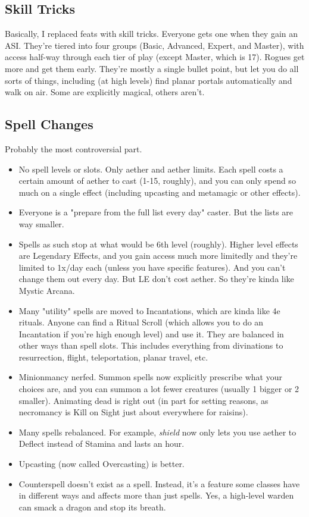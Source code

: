 \subsection*{Skill Tricks}
Basically, I replaced feats with skill tricks. Everyone gets one when they gain an ASI. They're tiered into four groups (Basic, Advanced, Expert, and Master), with access half-way through each tier of play (except Master, which is 17). Rogues get more and get them early. They're mostly a single bullet point, but let you do all sorts of things, including (at high levels) find planar portals automatically and walk on air. Some are explicitly magical, others aren't.
\subsection*{Spell Changes}
Probably the most controversial part.
\begin{itemize}
    \item No spell levels or slots. Only aether and aether limits. Each spell costs a certain amount of aether to cast (1-15, roughly), and you can only spend so much on a single effect (including upcasting and metamagic or other effects).
    \item Everyone is a "prepare from the full list every day" caster. But the lists are way smaller.
    \item Spells as such stop at what would be 6th level (roughly). Higher level effects are Legendary Effects, and you gain access much more limitedly and they're limited to 1x/day each (unless you have specific features). And you can't change them out every day. But LE don't cost aether. So they're kinda like Mystic Arcana.
    \item Many "utility" spells are moved to Incantations, which are kinda like 4e rituals. Anyone can find a Ritual Scroll (which allows you to do an Incantation if you're high enough level) and use it. They are balanced in other ways than spell slots. This includes everything from divinations to resurrection, flight, teleportation, planar travel, etc.
    \item Minionmancy nerfed. Summon spells now explicitly prescribe what your choices are, and you can summon a lot fewer creatures (usually 1 bigger or 2 smaller). Animating dead is right out (in part for setting reasons, as necromancy is Kill on Sight just about everywhere for raisins).
    \item Many spells rebalanced. For example, \textit{shield} now only lets you use aether to Deflect instead of Stamina and lasts an hour.
    \item Upcasting (now called Overcasting) is better.
    \item Counterspell doesn't exist as a spell. Instead, it's a feature some classes have in different ways and affects more than just spells. Yes, a high-level warden can smack a dragon and stop its breath.
\end{itemize}
